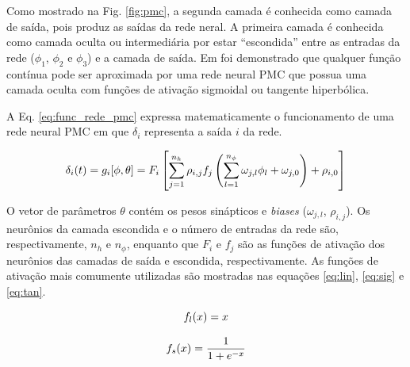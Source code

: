 Como mostrado na Fig. \ref{fig:pmc}, a segunda camada é conhecida como camada
de saída, pois produz as saídas da rede neral. A primeira camada é conhecida
como camada oculta ou intermediária por estar ``escondida'' entre as entradas da
rede ($\phi_1$, $\phi_2$ e $\phi_3$) e a camada de saída. Em
 foi demonstrado que qualquer função contínua pode ser
aproximada por uma rede neural PMC que possua uma camada oculta com funções de
ativação sigmoidal ou tangente hiperbólica.

A Eq. \ref{eq:func_rede_pmc} expressa matematicamente o funcionamento de uma
rede neural PMC em que $\delta_i$ representa a saída $i$ da rede.

\begin{equation}\label{eq:func_rede_pmc}
\delta_i(t) = g_i[\phi,\theta] =
              F_i\left[\sum_{j=1}^{n_h}\rho_{i,j}f_j
              \left(\sum_{l=1}^{n_\phi}\omega_{j,l}\phi_l+\omega_{j,0}\right)+
              \rho_{i,0}\right]
\end{equation}

O vetor de parâmetros $\theta$ contém os pesos sinápticos e {\it biases}
($\omega_{j,l}$, $\rho_{i,j}$). Os neurônios da camada escondida e o número de
entradas da rede são, respectivamente, $n_h$ e $n_\phi$, enquanto que $F_i$ e
$f_j$ são as funções de ativação dos neurônios das camadas de saída e escondida,
respectivamente. As funções de ativação mais comumente utilizadas são mostradas
nas equações \ref{eq:lin}, \ref{eq:sig} e \ref{eq:tan}.

\begin{equation}
\label{eq:lin}
f_l(x)=x \\
\end{equation} 


\begin{equation}
\label{eq:sig}
f_s(x) = \frac{1}{1+e^{-x}}\\
\end{equation} 

